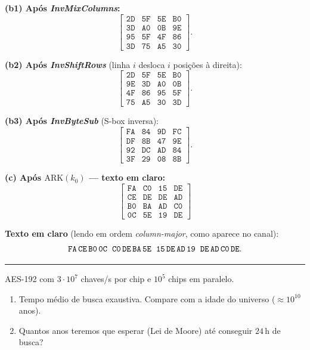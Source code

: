 \documentclass[12pt,a4paper]{article}
\newcommand{\exercicio}[1]{%
    \par\vspace{1.2em}
    \noindent
    {\color{black!55}\rule[-0.25em]{3pt}{1.6em}}%
    \hspace{0.6em}{\Large\bfseries Exerc\'{i}cio #1}
    \par\vspace{-0.4em}
    \noindent{\color{black!35}\rule{\textwidth}{0.4pt}}
    \par\vspace{0.35em}
}
\newenvironment{resposta}{%
    \begin{respostabox}
    \color{red!70!black}\sloppy
}{%
    \end{respostabox}
}
\begin{document}
\begin{resposta}
\textbf{(b1) Após \emph{InvMixColumns}:}
\[
\begin{bmatrix}\texttt{2D}&\texttt{5F}&\texttt{5E}&\texttt{B0}\\\texttt{3D}&\texttt{A0}&\texttt{0B}&\texttt{9E}\\\texttt{95}&\texttt{5F}&\texttt{4F}&\texttt{86}\\\texttt{3D}&\texttt{75}&\texttt{A5}&\texttt{30}\end{bmatrix}.
\]

\textbf{(b2) Após \emph{InvShiftRows}} (linha $i$ desloca $i$ posições à direita):
\[
\begin{bmatrix}\texttt{2D}&\texttt{5F}&\texttt{5E}&\texttt{B0}\\\texttt{9E}&\texttt{3D}&\texttt{A0}&\texttt{0B}\\\texttt{4F}&\texttt{86}&\texttt{95}&\texttt{5F}\\\texttt{75}&\texttt{A5}&\texttt{30}&\texttt{3D}\end{bmatrix}.
\]

\textbf{(b3) Após \emph{InvByteSub}} (S-box inversa):
\[
\begin{bmatrix}\texttt{FA}&\texttt{84}&\texttt{9D}&\texttt{FC}\\\texttt{DF}&\texttt{8B}&\texttt{47}&\texttt{9E}\\\texttt{92}&\texttt{DC}&\texttt{AD}&\texttt{84}\\\texttt{3F}&\texttt{29}&\texttt{08}&\texttt{8B}\end{bmatrix}.
\]

\textbf{(c) Após $\mathrm{ARK}(k_0)$ — texto em claro:}
\[
\boxed{\;\begin{bmatrix}\texttt{FA}&\texttt{C0}&\texttt{15}&\texttt{DE}\\\texttt{CE}&\texttt{DE}&\texttt{DE}&\texttt{AD}\\\texttt{B0}&\texttt{BA}&\texttt{AD}&\texttt{C0}\\\texttt{0C}&\texttt{5E}&\texttt{19}&\texttt{DE}\end{bmatrix}\;}
\]

\textbf{Texto em claro} (lendo em ordem \emph{column-major}, como aparece no canal):
\[
\texttt{FA\,CE\,B0\,0C\;\;C0\,DE\,BA\,5E\;\;15\,DE\,AD\,19\;\;DE\,AD\,C0\,DE}.
\]

\end{resposta}

\exercicio{9}
AES-192 com $3 \cdot 10^7$ chaves/s por chip e $10^5$ chips em paralelo.

\begin{enumerate}[label=\arabic*.]
    \item Tempo médio de busca exaustiva. Compare com a idade do universo ($\approx 10^{10}$ anos).
    \item Quantos anos teremos que esperar (Lei de Moore) até conseguir $24\,\mathrm{h}$ de busca?
\end{enumerate}
\end{document}
